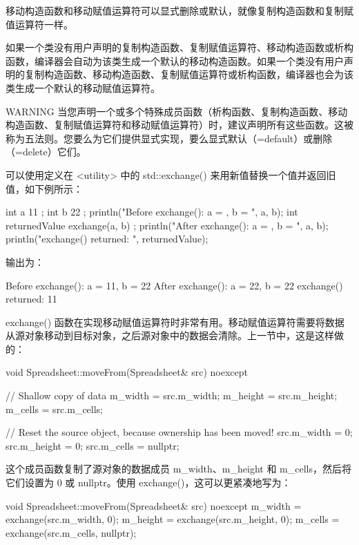 移动构造函数和移动赋值运算符可以显式删除或默认，就像复制构造函数和复制赋值运算符一样。

如果一个类没有用户声明的复制构造函数、复制赋值运算符、移动构造函数或析构函数，编译器会自动为该类生成一个默认的移动构造函数。如果一个类没有用户声明的复制构造函数、移动构造函数、复制赋值运算符或析构函数，编译器也会为该类生成一个默认的移动赋值运算符。

\begin{myWarning}{WARNING}
当您声明一个或多个特殊成员函数（析构函数、复制构造函数、移动构造函数、复制赋值运算符和移动赋值运算符）时，建议声明所有这些函数。这被称为五法则。您要么为它们提供显式实现，要么显式默认（=default）或删除（=delete）它们。
\end{myWarning}


可以使用定义在  <utility> 中的 std::exchange() 来用新值替换一个值并返回旧值，如下例所示：

\begin{cpp}
int a { 11 };
int b { 22 };
println("Before exchange(): a = {}, b = {}", a, b);
int returnedValue { exchange(a, b) };
println("After exchange(): a = {}, b = {}", a, b);
println("exchange() returned: {}", returnedValue);
\end{cpp}

输出为：

\begin{shell}
Before exchange(): a = 11, b = 22
After exchange(): a = 22, b = 22
exchange() returned: 11
\end{shell}

exchange() 函数在实现移动赋值运算符时非常有用。移动赋值运算符需要将数据从源对象移动到目标对象，之后源对象中的数据会清除。上一节中，这是这样做的：

\begin{cpp}
void Spreadsheet::moveFrom(Spreadsheet& src) noexcept
{
    // Shallow copy of data
    m_width = src.m_width;
    m_height = src.m_height;
    m_cells = src.m_cells;

    // Reset the source object, because ownership has been moved!
    src.m_width = 0;
    src.m_height = 0;
    src.m_cells = nullptr;
}
\end{cpp}

这个成员函数复制了源对象的数据成员 m\_width、m\_height 和 m\_cells，然后将它们设置为 0 或 nullptr。使用 exchange()，这可以更紧凑地写为：

\begin{cpp}
void Spreadsheet::moveFrom(Spreadsheet& src) noexcept
{
    m_width = exchange(src.m_width, 0);
    m_height = exchange(src.m_height, 0);
    m_cells = exchange(src.m_cells, nullptr);
}
\end{cpp}

